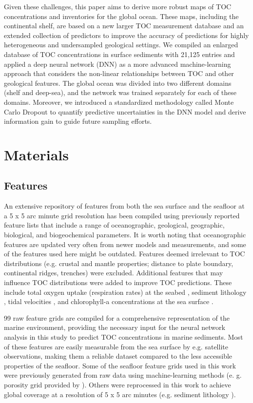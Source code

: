 \documentclass[journal abbreviation, manuscript]{copernicus}
\begin{document}
Given these challenges, this paper aims to derive more robust maps of TOC concentrations and inventories for the global ocean. These maps, including the continental shelf, are based on a new larger TOC measurement database and an extended collection of predictors to improve the accuracy of predictions for highly heterogeneous and undersampled geological settings. We compiled an enlarged database of TOC concentrations in surface sediments with 21,125 entries and applied a deep neural network (DNN) as a more advanced machine-learning approach that considers the non-linear relationships between TOC and other geological features. The global ocean was divided into two different domains (shelf and deep-sea), and the network was trained separately for each of these domains. Moreover, we introduced a standardized methodology called Monte Carlo Dropout to quantify predictive uncertainties in the DNN model and derive information gain to guide future sampling efforts.



\section{Materials}
\subsection{Features}
\label{sec:features}
An extensive repository of features from both the sea surface and the seafloor at a 5 x 5 arc minute grid resolution has been compiled using previously reported feature lists \citep{LeeTOCkNN, restrepo2, HartDavis2021EOT20} that include a range of oceanographic, geological, geographic, biological, and biogeochemical parameters. It is worth noting that oceanographic features are updated very often from newer models and measurements, and some of the features used here might be outdated. Features deemed irrelevant to TOC distributions (e.g. crustal and mantle properties; distance to plate boundary, continental ridges, trenches) were excluded. Additional features that may influence TOC distributions were added to improve TOC predictions. These include total oxygen uptake (respiration rates) at the seabed  \citep{TOU_JORGENSEN2022}, sediment lithology \citep{garlan2018}, tidal velocities \citep{HartDavis2021EOT20}, and chlorophyll-a concentrations at the sea surface \citep{nasaaqua}.


99 raw feature grids are compiled for a comprehensive representation of the marine environment, providing the necessary input for the neural network analysis in this study to predict TOC concentrations in marine sediments. Most of these features are easily measurable from the sea surface by e.g. satellite observations, making them a reliable dataset compared to the less accessible properties of the seafloor. Some of the seafloor feature grids used in this work were previously generated from raw data using machine-learning methods (e. g. porosity grid provided by \cite{Martin2005Porosity}). Others were reprocessed in this work to achieve global coverage at a resolution of 5 x 5 arc minutes (e.g. sediment lithology \citep{garlan2018}).
\end{document}
